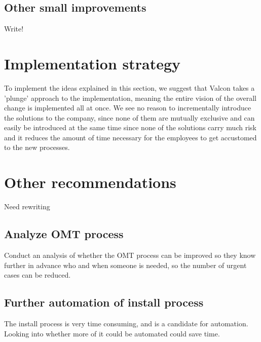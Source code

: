 \subsection{Other small improvements}

Write! 


\section{Implementation strategy}
To implement the ideas explained in this section, we suggest that Valcon takes a 'plunge' approach to the implementation, meaning the entire vision of the overall change is implemented all at once.
We see no reason to incrementally introduce the solutions to the company, since none of them are mutually exclusive and can easily be introduced at the same time since none of the solutions carry much risk and it reduces the amount of time necessary for the employees to get accustomed to the new processes.

\section{Other recommendations}
Need rewriting 

\subsection{Analyze OMT process}
Conduct an analysis of whether the OMT process can be improved so they know further in advance who and when someone is needed, so the number of urgent cases can be reduced.

\subsection{Further automation of install process}
The install process is very time consuming, and is a candidate for automation.
Looking into whether more of it could be automated could save time.

